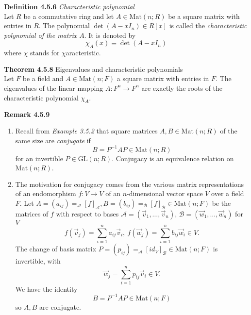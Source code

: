 \documentclass[8pt,landscape]{article}
\begin{document}
\begin{multicols}{3}
    \textbf{Definition 4.5.6} \emph{Characteristic polynomial} \\
    Let $R$ be a commutative ring and let $A \in \mathrm{Mat}(n; R)$ be a square matrix
    with entries in $R$.
    The polynomial $\det (A - x I_n) \in R[x]$ is called the
    \emph{characteristic polynomial of the matrix $A$}.
    It is denoted by
    \[
        \chi_A (x) \equiv \det(A - x I_n)
    \]
    where $\chi$ stands for $\chi$aracteristic.

    \textbf{Theorem 4.5.8} Eigenvalues and characteristic polynomials \\
    Let $F$ be a field and $A \in \mathrm{Mat}(n; F)$ a square matrix with entries in $F$.
    The eigenvalues of the linear mapping $A : F^n \to F^n$ are exactly the roots of the
    characteristic polynomial $\chi_A$.

    \textbf{Remark 4.5.9}
    \begin{enumerate}

        \item Recall from \emph{Example 3.5.2} that square matrices
            $A, B \in \mathrm{Mat}(n; R)$ of the same size are \emph{conjugate} if
            \[
                B = P^{-1} AP \in \mathrm{Mat}(n; R)
            \]
            for an invertible $P \in \mathrm{GL}(n; R)$.
            Conjugacy is an equivalence relation on $\mathrm{Mat}(n; R)$.

        \item The motivation for conjugacy comes from the various matrix representations of
            an endomorphism $f : V \to V$ of an $n$-dimensional vector space $V$ over a
            field $F$.
            Let $A = (a_{ij}) = _\mathcal{A} {[f]}_\mathcal{A},
            B = (b_{ij}) = _\mathcal{B} {[f]}_\mathcal{B} \in \mathrm{Mat}(n; F)$
            be the matrices of $f$ with respect to bases
            $\mathcal{A} = (\vec{v}_1, \ldots, \vec{v}_n)$,
            $\mathcal{B} = (\vec{w}_1, \ldots, \vec{w}_n)$ for $V$
            \[
                f(\vec{v}_j) = \sum_{i=1}^n a_{ij} \vec{v}_i, \ f(\vec{w}_j) =
                \sum_{i=1}^n b_{ij} \vec{w}_i \in V.
            \]
            The change of basis matrix $P = (p_{ij}) =
            _\mathcal{A} {[id_V]}_\mathcal{B} \in \mathrm{Mat}(n; F)$
            is invertible, with
            \[
                \vec{w}_j = \sum_{i=1}^n p_{ij} \vec{v}_i \in V.
            \]
            We have the identity
            \[
                B = P^{-1} AP \in \mathrm{Mat} (n; F)
            \]
            so $A, B$ are conjugate.


\end{enumerate}
\end{multicols}
\end{document}
